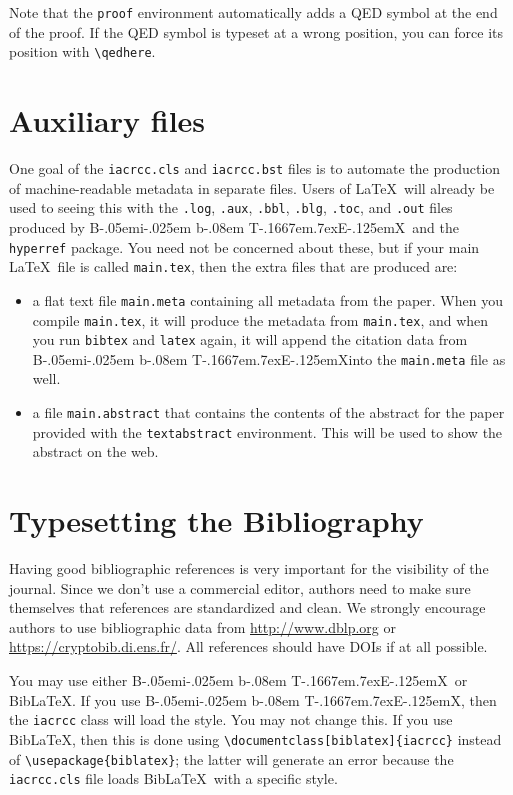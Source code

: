 \documentclass{iacrcc}
\def\BibTeX{{\rm B\kern-.05em{\sc i\kern-.025em b}\kern-.08em
    T\kern-.1667em\lower.7ex\hbox{E}\kern-.125emX}}
\def\BibLaTeX{Bib\LaTeX}
\begin{document}
Note that the \texttt{proof} environment automatically adds a QED
symbol at the end of the proof.
If the QED symbol
is typeset at a wrong position, you can force its position with
\verb+\qedhere+.

\section{Auxiliary files}
One goal of the \texttt{iacrcc.cls} and \texttt{iacrcc.bst}
  files is to automate the production of machine-readable metadata in
  separate files. Users of \LaTeX\ will already be used to seeing this
  with the \texttt{.log}, \texttt{.aux}, \texttt{.bbl}, \texttt{.blg},
  \texttt{.toc}, and \texttt{.out} files produced by \BibTeX\ 
  and the \texttt{hyperref} package.  You need not be concerned about
  these, but if your main \LaTeX\ file is called \texttt{main.tex},
  then the extra files that are produced are:
\begin{itemize}
\item a flat text file \texttt{main.meta} containing all metadata
  from the paper.  When you compile
  \texttt{main.tex}, it will produce the metadata from
  \texttt{main.tex}, and when you run \texttt{bibtex} and
  \texttt{latex} again, it will append the citation data from
  \BibTeX into the \texttt{main.meta} file as well.
\item a file \texttt{main.abstract} that contains
  the contents of the abstract for the paper provided with the
  \texttt{textabstract} environment. This will be used to show
  the abstract on the web.
\end{itemize}

\section{Typesetting the Bibliography}
\label{sec:biblio}

Having good bibliographic references is very important for the
visibility of the journal.  Since we don't use a commercial editor,
authors need to make sure themselves that references are standardized
and clean.  We strongly encourage authors to use bibliographic data
from \url{http://www.dblp.org} or \url{https://cryptobib.di.ens.fr/}.
All references should have DOIs if at all possible.

You may use either \BibTeX\ or \BibLaTeX. If you use \BibTeX,
then the \texttt{iacrcc} class will load the
\verb++ style.  You may not change
this. If you use \BibLaTeX, then this is done using
\verb+\documentclass[biblatex]{iacrcc}+ instead of
\verb+\usepackage{biblatex}+; the latter will generate an error
because the \texttt{iacrcc.cls} file loads \BibLaTeX\ with a
specific style.
\end{document}
